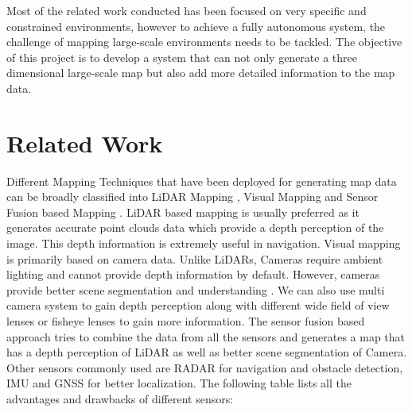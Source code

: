 \documentclass{article}
\begin{document}
	Most of the related work conducted has been focused on very specific and constrained environments, however to achieve a fully autonomous system, the challenge of mapping large-scale environments needs to be tackled. The objective of this project is to develop a system that can not only generate a three dimensional large-scale map but also add more detailed information to the map data.
	

	
	\section{Related Work}

	Different Mapping Techniques that have been deployed for generating map data can be broadly classified into 
	LiDAR Mapping
	\cite{levinson_robust_2010},
	Visual Mapping
	\cite{chen_combining_2017}
	and Sensor Fusion based Mapping
	\cite{silva_fusion_nodate}. 
	LiDAR based mapping is usually preferred as it generates accurate point clouds data which provide a depth perception of the image. This depth information is extremely useful in navigation. Visual mapping is primarily based on camera data. Unlike LiDARs, Cameras require ambient lighting and cannot provide depth information by default. However, cameras provide better scene segmentation and understanding
	\cite{heng_project_2018}.
	We can also use multi camera system
	\cite{geiger_stereoscan:_2011}
	to gain depth perception along with different wide field of view lenses or fisheye lenses
	\cite{cui_real-time_2018}
	to gain more information.
	The sensor fusion based approach tries to combine the data from all the sensors and generates a map that has a depth perception of LiDAR as well as better scene segmentation of Camera. Other sensors commonly used are RADAR for navigation and obstacle detection, IMU and GNSS for better localization.
	The following table lists all the advantages and drawbacks of different sensors:
\end{document}

